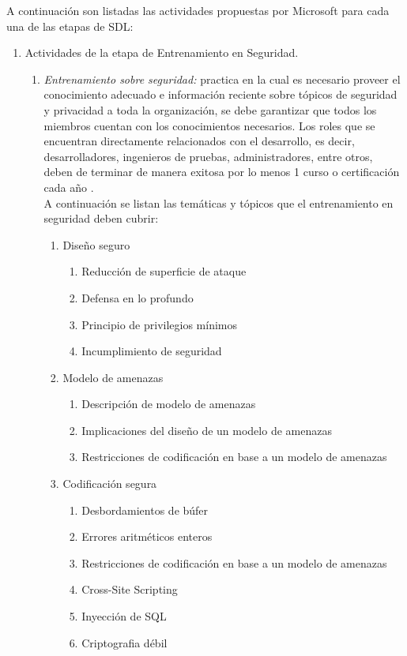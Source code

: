\documentclass[runningheads,a4paper]{llncs}
\begin{document}
A continuación son listadas las actividades propuestas por Microsoft para cada una de las etapas de \gls{SDL}:

\begin{enumerate}
\item Actividades de la etapa de Entrenamiento en Seguridad.
\\
\begin{enumerate}

\item \textit{Entrenamiento sobre seguridad: }practica en la cual es necesario  proveer el conocimiento adecuado e información reciente sobre tópicos de seguridad y privacidad a toda la organización, se debe garantizar que todos los miembros cuentan con los conocimientos necesarios. Los roles que se encuentran directamente relacionados con el desarrollo, es decir, desarrolladores, ingenieros de pruebas, administradores, entre otros, deben de terminar de manera exitosa por lo menos 1 curso o certificación cada año \cite{SDLWhitePaper}. \\

A continuación se listan las temáticas y tópicos que el entrenamiento en seguridad deben cubrir:\\

\begin{enumerate}
\item Diseño seguro
	\begin{enumerate}
		\item Reducción de superficie de ataque
		\item Defensa en lo profundo
		\item Principio de privilegios mínimos
		\item Incumplimiento de seguridad\\
		
	\end{enumerate}
\item Modelo de amenazas
	\begin{enumerate}
		\item Descripción de modelo de amenazas	
		\item Implicaciones del diseño de un modelo de amenazas
		\item Restricciones de codificación en base a un modelo de amenazas\\
		
	\end{enumerate}
\item Codificación segura
	\begin{enumerate}
		\item Desbordamientos de búfer	
		\item Errores aritméticos enteros
		\item Restricciones de codificación en base a un modelo de amenazas
		\item \gls{Cross-Site Scripting}	
		\item Inyección de \gls{SQL}
		\item \gls{Criptografia} débil\\
		

\end{enumerate}
\end{enumerate}
\end{enumerate}
\end{enumerate}
\end{document}
